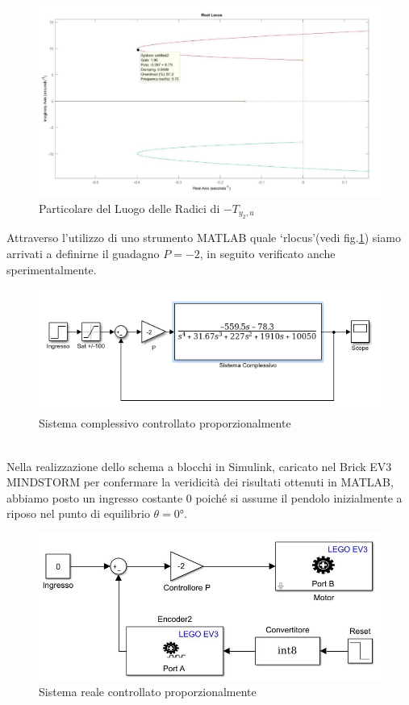 \newpage
\begin{figure}[ht]
	\centering
	\includegraphics[width=\textwidth]{gainOttimaleft.PNG}
	\caption{Particolare del Luogo delle Radici di $-T_{y_2,u}$}
	\label{gainOttimaleft}
\end{figure}
Attraverso l'utilizzo di uno strumento MATLAB quale `rlocus'(vedi fig.\ref{gainOttimaleft}) siamo arrivati a definirne il guadagno $P=-2$, in seguito verificato anche sperimentalmente.
\begin{figure}[ht]
	\centering
	\includegraphics[width=\textwidth]{SisComplessivoPNRetroazionato.PNG}
	\caption{Sistema complessivo controllato proporzionalmente}
	\label{SisComplessivoPNRetroazionato}
\end{figure}
\\Nella realizzazione dello schema a blocchi in Simulink, caricato nel Brick EV3 MINDSTORM per confermare la veridicità dei risultati ottenuti in MATLAB, abbiamo posto un ingresso costante 0 poiché si assume il pendolo inizialmente a riposo nel punto di equilibrio $\theta=\ang{0}$.
\begin{figure}[ht]
	\centering
	\includegraphics[width=\textwidth]{pendoloReale.jpg}
	\caption{Sistema reale controllato proporzionalmente}
	\label{pendoloReale}
\end{figure}
